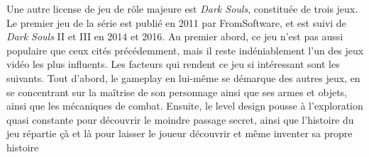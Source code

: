 Une autre license de jeu de rôle majeure est \textit{Dark Souls}, constituée de trois jeux. 
Le premier jeu de la série est publié en 2011 par FromSoftware, et est suivi de \textit{Dark Souls} II et III en 2014 et 2016. 
Au premier abord, ce jeu n'est pas aussi populaire que ceux cités précédemment, mais il reste indéniablement l'un des jeux vidéo les plus influents. 
Les facteurs qui rendent ce jeu si intéressant sont les suivants. 
Tout d'abord, le gameplay en lui-même se démarque des autres jeux, en se concentrant sur la maîtrise de son personnage ainsi que ses armes et objets, ainsi que les mécaniques de combat. 
Ensuite, le level design pousse à l'exploration quasi constante pour découvrir le moindre passage secret, ainsi que l'histoire du jeu répartie çà et là pour laisser le joueur découvrir et même inventer sa propre histoire 